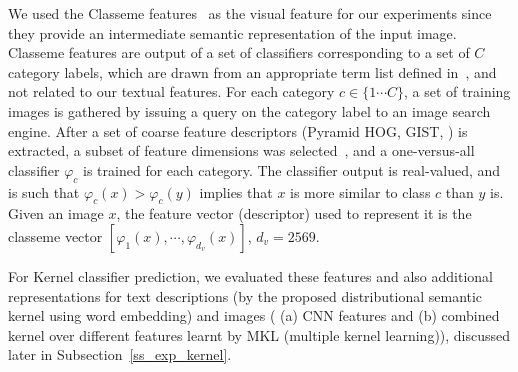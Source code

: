 We used the Classeme features~\cite{classemes} as the visual feature for our experiments since they provide an intermediate semantic representation of the input image. Classeme features are output of a set of classifiers corresponding to a set of $C$ category labels, which are drawn from an appropriate term list defined in~\cite{classemes}, and not related to our textual features. For each category $c \in \lbrace 1 \cdots C \rbrace $, a set of training images is gathered by issuing a query on the category label to an image search engine.
After a set of coarse feature descriptors (Pyramid HOG, GIST, \etc) is extracted, a subset of feature dimensions was selected~\cite{classemes}, and  a one-versus-all classifier $\varphi_{c}$ is trained for each category. The classifier output is real-valued, and is such that $\varphi_{c}(x) > \varphi_{c}(y)$ implies that $x$ is more similar to class $c$ than $y$ is. Given an image $x$,  the feature vector (descriptor) used to represent it is the classeme vector $  [\varphi_{1} (x),  \cdots, \varphi_{d_v} (x)]$, $d_v=2569$.

For Kernel classifier prediction, we evaluated  these features and also additional representations  for text descriptions (by the proposed distributional semantic kernel using word embedding) and  images ( (a) CNN features and (b)  combined kernel over different features learnt by MKL (multiple kernel learning)), discussed later in Subsection~\ref{ss_exp_kernel}.

 

